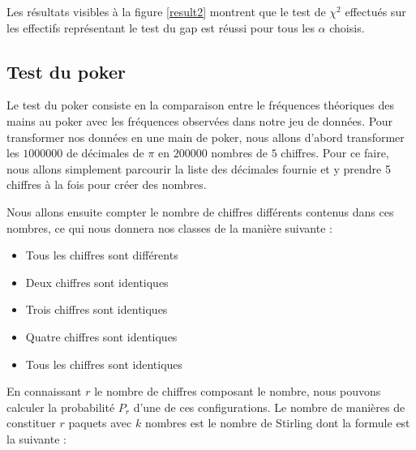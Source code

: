 \documentclass[10pt,a4paper]{article}
\begin{document}
Les résultats visibles à la figure \ref{result2} montrent que le test de $\chi^2$ effectués sur les effectifs représentant le test du gap est réussi pour tous les $\alpha$ choisis.

\subsection{Test du poker}

Le test du poker consiste en la comparaison entre le fréquences théoriques des mains au poker avec les
fréquences observées dans notre jeu de données. Pour transformer nos données en une main de poker, nous allons d'abord transformer les $1 000 000$ de décimales de $\pi$ en $200 000$ nombres de $5$ chiffres. Pour ce faire, nous allons simplement parcourir la liste des décimales fournie et y prendre 5 chiffres à la fois pour créer des nombres.\newline 

Nous allons ensuite compter le nombre de chiffres différents contenus dans ces nombres, ce qui nous donnera nos classes de la manière
suivante : \\
\begin{itemize}
\item Tous les chiffres sont différents
\item Deux chiffres sont identiques
\item Trois chiffres sont identiques
\item Quatre chiffres sont identiques
\item Tous les chiffres sont identiques
\end{itemize}
\bigskip
En connaissant $r$ le nombre de chiffres composant le nombre, nous pouvons calculer la probabilité $P_r$ d'une de ces configurations.
Le nombre de manières de constituer $r$ paquets avec $k$ nombres est le nombre de Stirling dont la formule est la suivante :
\end{document}
